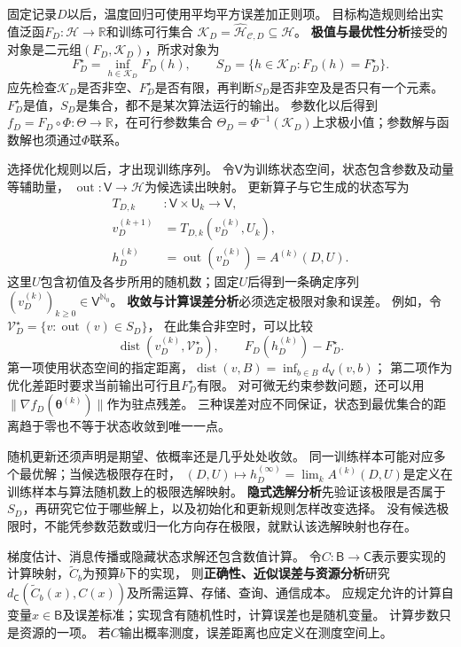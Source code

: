 固定记录$D$以后，温度回归可使用平均平方误差加正则项。
目标构造规则给出实值泛函$F_D:\mathcal H\to\mathbb R$和训练可行集合
$\mathcal K_D=\widehat{\mathcal H}_{\mathcal C,D}\subseteq\mathcal H$。
\textbf{极值与最优性分析}接受的对象是二元组$(F_D,\mathcal K_D)$，所求对象为
\[
  F_D^\star=\inf_{h\in\mathcal K_D}F_D(h),\qquad
  S_D=\{h\in\mathcal K_D:F_D(h)=F_D^\star\}.
\]
应先检查$\mathcal K_D$是否非空、$F_D^\star$是否有限，再判断$S_D$是否非空及是否只有一个元素。
$F_D^\star$是值，$S_D$是集合，都不是某次算法运行的输出。
参数化以后得到$f_D=F_D\circ\Phi:\Theta\to\mathbb R$，在可行参数集合
$\Theta_D=\Phi^{-1}(\mathcal K_D)$上求极小值；参数解与函数解也须通过$\Phi$联系。

选择优化规则以后，才出现训练序列。
令$\mathsf V$为训练状态空间，状态包含参数及动量等辅助量，
$\operatorname{out}:\mathsf V\to\mathcal H$为候选读出映射。
更新算子与它生成的状态写为
\begin{equation}
  \begin{aligned}
    T_{D,k}&:\mathsf V\times\mathsf U_k\to\mathsf V,\\
    v_D^{(k+1)}&=T_{D,k}(v_D^{(k)},U_k),\\
    h_D^{(k)}&=\operatorname{out}(v_D^{(k)})=A^{(k)}(D,U).
  \end{aligned}
  \label{eq:future-task-update-and-readout}
\end{equation}
这里$U$包含初值及各步所用的随机数；固定$U$后得到一条确定序列
$(v_D^{(k)})_{k\geq0}\in\mathsf V^{\mathbb N_0}$。
\textbf{收敛与计算误差分析}必须选定极限对象和误差。
例如，令$\mathcal V_D^\star=\{v:\operatorname{out}(v)\in S_D\}$，
在此集合非空时，可以比较
\[
  \operatorname{dist}(v_D^{(k)},\mathcal V_D^\star),
  \qquad F_D(h_D^{(k)})-F_D^\star.
\]
第一项使用状态空间的指定距离，$\operatorname{dist}(v,B)=\inf_{b\in B}d_{\mathsf V}(v,b)$；
第二项作为优化差距时要求当前输出可行且$F_D^\star$有限。
对可微无约束参数问题，还可以用$\lVert\nabla f_D(\bm\theta^{(k)})\rVert$作为驻点残差。
三种误差对应不同保证，状态到最优集合的距离趋于零也不等于状态收敛到唯一一点。

随机更新还须声明是期望、依概率还是几乎处处收敛。
同一训练样本可能对应多个最优解；当候选极限存在时，
$(D,U)\mapsto h_D^{(\infty)}=\lim_k A^{(k)}(D,U)$是定义在训练样本与算法随机数上的极限选解映射。
\textbf{隐式选解分析}先验证该极限是否属于$S_D$，再研究它位于哪些解上，以及初始化和更新规则怎样改变选择。
没有候选极限时，不能凭参数范数或归一化方向存在极限，就默认该选解映射也存在。

梯度估计、消息传播或隐藏状态求解还包含数值计算。
令$C:\mathsf B\to\mathsf C$表示要实现的计算映射，$\widetilde C_b$为预算$b$下的实现，
则\textbf{正确性、近似误差与资源分析}研究
$d_{\mathsf C}(\widetilde C_b(x),C(x))$及所需运算、存储、查询、通信成本。
应规定允许的计算自变量$x\in\mathsf B$及误差标准；实现含有随机性时，计算误差也是随机变量。
计算步数只是资源的一项。
若$C$输出概率测度，误差距离也应定义在测度空间上。

